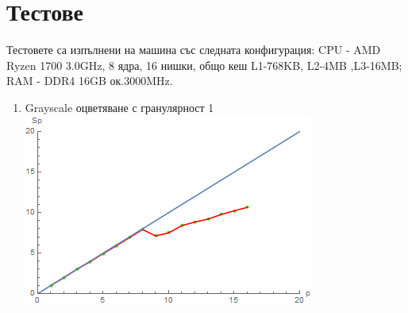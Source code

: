 \section{Тестове}
\begin{Large}
	Тестовете са изпълнени на машина със следната конфигурация: CPU - AMD Ryzen 1700 3.0GHz, 8 ядра, 16 нишки, общо кеш L1-768KB, L2-4MB
,L3-16MB; RAM - DDR4 16GB ок.3000MHz.
\begin{enumerate}
\item Grayscale оцветяване с гранулярност 1
\newline
\includegraphics[scale=1]{tt1}


\end{enumerate}
\end{Large}
